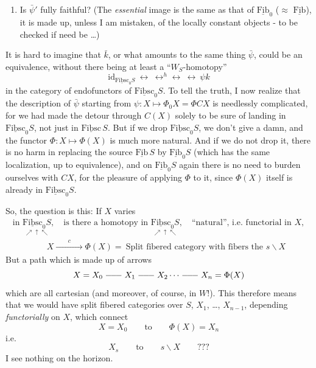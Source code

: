 \documentclass[11pt]{article}
\newcommand{\printedpage}[1]{\marginpar{\footnotesize p.~#1}}
\newcommand{\msp}[1]{\marginpar{\footnotesize [#1]}}
\newcommand{\uu}[1]{\underline{\mathrm{#1}}}
\newcommand{\lline}{\mathrel{\relbar\joinrel\relbar\joinrel\relbar}}
\begin{document}
\begin{enumerate}[leftmargin=*]
\item[$3^o$)] Is $\bar{\psi}'$ fully faithful? (The \textit{essential} image is the same as that of $\uu{Fib}_0$ ($\approx$ $\uu{Fib}$), it is made up, unless I am mistaken, of the locally constant objects - to be checked if need be \dots)
\end{enumerate}

\printedpage{23}

\msp{page 39}
It is hard to imagine that $\bar{k}$, or what amounts to the same thing $\bar{\psi}$, could be an equivalence, without there being at least a ``$W_S$-homotopy''
\[
\mathrm{id}_{\uu{Fibsc}_0 S} \ \leftrightarrow\ \leftrightarrow^{h}\!\leftrightarrow\ \leftrightarrow\ \psi k
\]
in the category of endofunctors of $\uu{Fibsc}_0 S$. To tell the truth, I now realize that the description of $\bar{\psi}$ starting from $\psi : X \longmapsto \Phi_0 X = \Phi C X$ is needlessly complicated, for we had made the detour through $C(X)$ solely to be sure of landing in $\uu{Fibsc}_0 S$, not just in $\uu{Fibsc}\, S$. But if we drop $\uu{Fibsc}_0 S$, we don't give a damn, and the functor $\Phi : X \longmapsto \Phi(X)$ is much more natural. And if we do not drop it, there is no harm in replacing the source $\uu{Fib}\, S$ by $\uu{Fib}_0 S$ (which has the same localization, up to equivalence), and on $\uu{Fib}_0 S$ again there is no need to burden ourselves with $CX$, for the pleasure of applying $\Phi$ to it, since $\Phi(X)$ itself is already in $\uu{Fibsc}_0 S$.

So, the question is this: If $X$ varies
\msp{page 40}
\[
\begin{array}{l}
\text{in } \underset{\nearrow\uparrow\nwarrow}{\uu{Fibsc}_0 S}, \quad \text{is there a homotopy in } \underset{\nearrow\uparrow\nwarrow}{\uu{Fibsc}_0 S}, \quad \text{``natural'', i.e. functorial in } X, \\[2ex]
\qquad\qquad X \xrightarrow{\qquad c \qquad} \Phi(X) = \ \text{Split fibered category with fibers the } s\backslash X
\end{array}
\]
But a path which is made up of arrows
\[
X = X_0 \lline X_1 \lline X_2 \cdots \lline X_n = \Phi(X)
\]
which are all cartesian (and moreover, of course, in $W$!). This therefore means that we would have split fibered categories over $S$, $X_1$, \dots, $X_{n-1}$, depending \textit{functorially} on $X$, which connect
\[
X = X_0 \qquad \text{to} \qquad \Phi(X) = X_n
\]
i.e.
\[
X_s \qquad \text{to} \qquad s\backslash X \qquad \text{???}
\]
I see nothing on the horizon.
\end{document}
